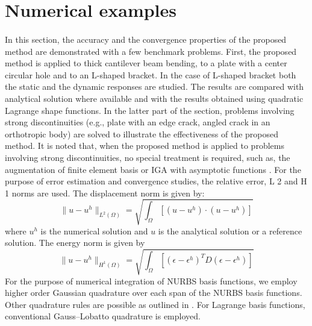 \section{Numerical examples}
\label{iso_section:examples}
\paragraph{}
In this section, the accuracy and the convergence properties of the proposed method are demonstrated with a few
    benchmark problems.
First, the proposed method is applied to thick cantilever beam bending, to a plate with a center
    circular hole and to an L-shaped bracket.
In the case of L-shaped bracket both the static and the dynamic responses are studied.
The results are compared with analytical solution where available and with the results obtained using quadratic
    Lagrange shape functions.
In the latter part of the section, problems involving strong discontinuities (e.g., plate with an edge crack,
    angled crack in an orthotropic body) are solved to illustrate the effectiveness of the proposed method.
It is noted that, when the proposed method is applied to problems involving strong discontinuities, no special 
    treatment is required, such as, the augmentation of finite element basis or IGA with asymptotic functions
    \citep{Benson2010} \citep{De2011}.
For the purpose of error estimation and convergence studies, the relative error, L 2 and H 1 norms are used.
The displacement norm is given by:
    \begin{equation}
        \| u - u^h \|_{L^2(\Omega)}=
        \sqrt{
            \int_{\Omega}\left[
                \left(
                    u-u^h
                \right) \cdot
                \left(
                    u-u^h
                \right)
            \right]
        }
    \end{equation}
%
where $u^h$ is the numerical solution and $u$ is the analytical solution or a reference solution.
The energy norm is given by
    \begin{equation}
        \| u - u^h \|_{H^1(\Omega)}=
        \sqrt{
            \int_{\Omega}\left[
                \left(
                    \epsilon - \epsilon^h
                \right)^T D
                \left(
                    \epsilon - \epsilon^h
                \right)
            \right]
        }
    \end{equation}
%
For the purpose of numerical integration of NURBS basis functions, we employ higher order Gaussian quadrature over each span of the NURBS basis functions.
Other quadrature rules are possible as outlined in \citep{Hug2010}.
For Lagrange basis functions, conventional Gauss–Lobatto quadrature is employed.

